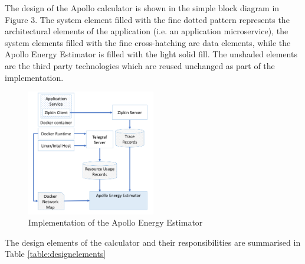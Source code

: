 The design of the Apollo calculator is shown in the simple block diagram in Figure 3. The system element filled with the fine dotted pattern represents the architectural elements of the application (i.e. an application microservice), the system elements filled with the fine cross-hatching are data elements, while the Apollo Energy Estimator is filled with the light solid fill.  The unshaded elements are the third party technologies which are reused unchanged as part of the implementation.

\begin{figure}
\centering
\includegraphics[width=0.5\textwidth]{Figures/implementation-design}
\caption{Implementation of the Apollo Energy Estimator}
\label{figure:implementation}
\end{figure}

The design elements of the calculator and their responsibilities are summarised in Table \ref{table:designelements}

